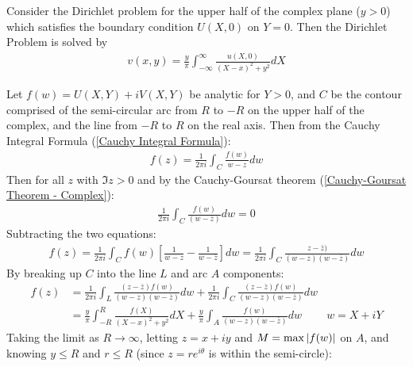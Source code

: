 \documentclass[12pt, english]{book}
\makeatletter
\renewenvironment{proof}[1][\proofname]{\par
	\pushQED{\qed}%
	\normalfont \topsep6\p@\@plus6\p@\relax
	\list{}{%
		\settowidth{\leftmargin}{\itshape\proofname:\hskip\labelsep}%
		\setlength{\labelwidth}{0pt}%
		\setlength{\itemindent}{-\leftmargin}%
		}%
	\item[\hskip\labelsep\itshape#1\@addpunct{:}]\ignorespaces
	}{\popQED\endlist\@endpefalse}
\makeatother
\begin{document}
	\begin{definition}
		\label{Poisson Integral Formula (Upper Half Plane) Definition - Complex}
		Consider the Dirichlet problem for the upper half of the complex plane (\(y>0\)) which satisfies the boundary condition \(U(X,0)\) on \(Y = 0\). Then the Dirichlet Problem is solved by 
		\begin{align*}
			v(x,y) = \frac{y}{\pi} \int_{-\infty}^{\infty} \frac{u(X,0)}{(X-x)^2 + y^2} dX
		\end{align*}
	\end{definition}
	\begin{proof}
		Let \(f(w) = U(X,Y) + iV(X,Y)\) be analytic for \(Y>0\), and \(C\) be the contour comprised of the semi-circular arc from \(R\) to \(-R\) on the upper half of the complex, and the line from \(-R\) to \(R\) on the real axis. Then from the Cauchy Integral Formula (\cref{Cauchy Integral Formula}):
		\begin{align*}
			f(z) = \frac{1}{2\pi i} \int_{C} \frac{f(w)}{w-z} dw
		\end{align*}
		Then for all \(z\) with \(\Im{z}>0\) and by the Cauchy-Goursat theorem (\cref{Cauchy-Goursat Theorem - Complex}):
		\begin{align*}
			\frac{1}{2\pi i} \int_{C} \frac{f(w)}{(w-\bar{z})} dw = 0
		\end{align*}
		Subtracting the two equations:
		\begin{align*}
			f(z) 
			= \frac{1}{2\pi i} \int_{C} f(w) \left[\frac{1}{w - z} - \frac{1}{w - \bar{z}}\right] dw
			= \frac{1}{2\pi i} \int_{C} \frac{z - \bar{z})}{(w - z)(w - \bar{z})} dw
		\end{align*}
		By breaking up \(C\) into the line \(L\) and arc \(A\) components:
		\begin{align*}
			f(z) 
			&= \frac{1}{2\pi i} \int_{L} \frac{(z-\bar{z})f(w)}{(w-z)(w-\bar{z})} dw
			  + \frac{1}{2\pi i} \int_{C} \frac{(z-\bar{z})f(w)}{(w-z)(w-\bar{z})} dw \\
			&= \frac{y}{\pi} \int_{-R}^{R} \frac{f(X)}{(X-x)^2 + y^2} dX
			  + \frac{y}{\pi} \int_{A} \frac{f(w)}{(w-z)(w-\bar{z})} dw 
			  & w = X + iY
		\end{align*}
		Taking the limit as \(R \rightarrow \infty\), letting \(z = x+iy\) and \(M = \max\abs{f(w)}\) on \(A\), and knowing \(y \leq R\) and \(r \leq R\) (since \(z = re^{i\theta}\) is within the semi-circle):
		{\color{Grey}
		\begin{align*}

\end{align*}}
\end{proof}
\end{document}
